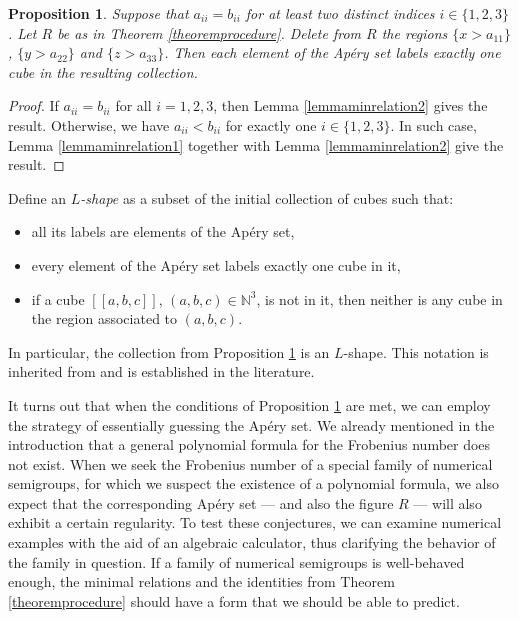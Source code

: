 \documentclass[12pt]{article}
\newtheorem{prop}[thm]{Proposition}
\theoremstyle{remark}
\begin{document}
\begin{prop}\label{proptrick}
    Suppose that $a_{ii} = b_{ii}$ for at least two distinct indices $i \in \{1,2,3\}$. Let $R$ be as in Theorem \ref{theoremprocedure}. Delete from $R$
    the regions $\{x > a_{11}\}$, $\{y > a_{22}\}$ and $\{z > a_{33}\}$. Then each element of the Ap{\'e}ry set labels exactly one cube in the resulting collection.
\end{prop}

\begin{proof}
    If $a_{ii} = b_{ii}$ for all $i = 1,2,3$, then Lemma \ref{lemmaminrelation2} gives the result. Otherwise, we have $a_{ii} < b_{ii}$ for exactly one $i \in \{1,2,3\}$. In such case, Lemma \ref{lemmaminrelation1} together with Lemma \ref{lemmaminrelation2} give the result.
\end{proof}
\noindent
Define an \emph{$L$-shape} as a subset of the initial collection of cubes such that:
\begin{itemize}
    \item all its labels are elements of the Ap{\'e}ry set,
    \item every element of the Ap{\'e}ry set labels exactly one cube in it,
    \item if a cube $[[a,b,c]]$, $(a,b,c) \in \mathbb{N}^3$, is not in it, then neither is any cube in the region associated to $(a,b,c)$.
\end{itemize}
In particular, the collection from Proposition \ref{proptrick} is an $L$-shape. This notation is inherited from \cite{AGUILOGOST2015} and is established in the literature.
 


It turns out that when the conditions of Proposition \ref{proptrick} are met, we can employ the strategy of essentially guessing the Ap{\'e}ry set. We already mentioned in the introduction that a general polynomial formula for the Frobenius number does not exist. When we seek the Frobenius number of a special family of numerical semigroups, for which we suspect the existence of a polynomial formula, we also expect that the corresponding Ap{\'e}ry set --- and also the figure $R$ --- will also exhibit a certain regularity. To test these conjectures, we can examine numerical examples with the aid of an algebraic calculator, thus clarifying the behavior of the family in question.
If a family of numerical semigroups is well-behaved enough, the minimal relations and the identities from Theorem \ref{theoremprocedure} should have a form that we should be able to predict. 
\end{document}
